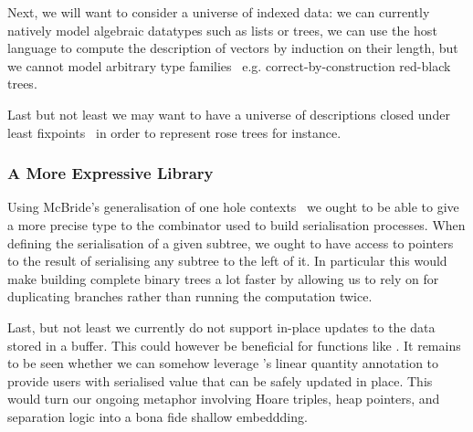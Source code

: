 Next, we will want to consider a universe of indexed data:
we can currently natively model algebraic datatypes such as lists or trees,
we can use the host language to compute the description of vectors by induction on their length,
but we cannot model arbitrary type families~\cite{DBLP:journals/fac/Dybjer94}
e.g. correct-by-construction red-black trees.

Last but not least we may want to have a universe of descriptions closed
under least fixpoints~\cite{DBLP:phd/ethos/Morris07}
in order to represent rose trees for instance.

\subsubsection{A More Expressive Library}

Using McBride's generalisation of one hole contexts~\cite{DBLP:conf/popl/McBride08}
we ought to be able to give a more precise type to the combinator
\IdrisFunction{(\#)} used to build serialisation processes.
%
When defining the serialisation of a given subtree, we ought to have access to
pointers to the result of serialising any subtree to the left of it. In particular
this would make building complete binary trees a lot faster by allowing us to rely
on  for duplicating branches rather than running the computation
twice.

Last, but not least we currently do not support in-place updates to
the data stored in a buffer.
This could however be beneficial for functions like .
%
It remains to be seen whether we can somehow leverage \idris{}'s
linear quantity annotation to provide users with serialised value that
can be safely updated in place.
%
This would turn our ongoing metaphor involving Hoare triples, heap pointers,
and separation logic into a bona fide shallow embeddding.
